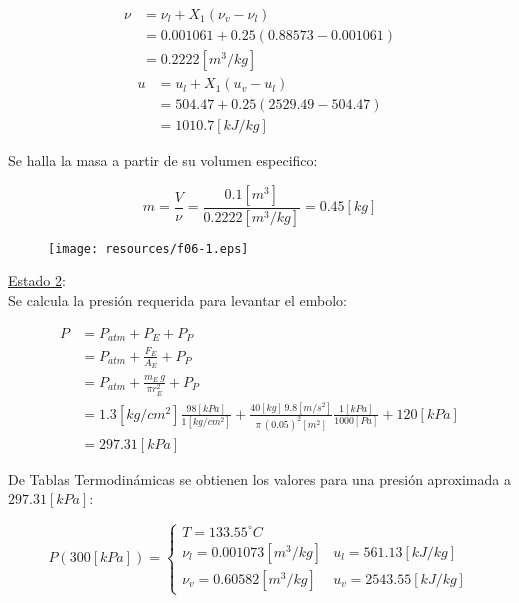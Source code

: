 \documentclass[letter,11pt]{article}
\begin{document}
\begin{enumerate}
\begin{equation*}
    \begin{split}
        \nu &= \nu_l + X_1(\nu_v - \nu_l) \\
            &= 0.001061 + 0.25 (0.88573 - 0.001061) \\
            &= 0.2222[m^3/kg]
    \end{split}
\end{equation*}
\begin{equation*}
    \begin{split}
        u &= u_l + X_1(u_v - u_l) \\
          &= 504.47 + 0.25 (2529.49 - 504.47) \\
          &= 1010.7[kJ/kg]
    \end{split}
\end{equation*}

Se halla la masa a partir de su volumen especifico:

\begin{equation*}
    m = \frac{V}{\nu} = \frac{0.1[m^3]}{0.2222[m^3/kg]}
      = 0.45[kg]
\end{equation*}

\begin{figure}[H]
\centering
\texttt{[image: resources/f06-1.eps]}
\end{figure}

\underline{Estado 2}: \\
Se calcula la presión requerida para levantar el embolo:

\begin{equation*}
    \begin{split}
        P &= P_{atm} + P_E + P_P  \\
          &= P_{atm} + \frac{F_E}{A_E} + P_P \\
          &= P_{atm} + \frac{m_E\,g}{\pi r_E^2} + P_P \\
          &= 1.3[kg/cm^2]\frac{98[kPa]}{1[kg/cm^2]}
             + \frac{40[kg]\,9.8[m/s^2]}{\pi\,(0.05)^2[m^2]}
             \frac{1[kPa]}{1000[Pa]} + 120[kPa] \\
          &= 297.31[kPa]
    \end{split}
\end{equation*}

De Tablas Termodinámicas se obtienen los valores para una presión aproximada a
$297.31[kPa]$:

\begin{equation*}
    P(300[kPa]) = \begin{cases}
        T = 133.55^\circ C \\
        \nu_l = 0.001073[m^3/kg] & u_l = 561.13[kJ/kg] \\
        \nu_v = 0.60582[m^3/kg]  & u_v = 2543.55[kJ/kg]
    \end{cases}
\end{equation*}


\end{enumerate}
\end{document}
